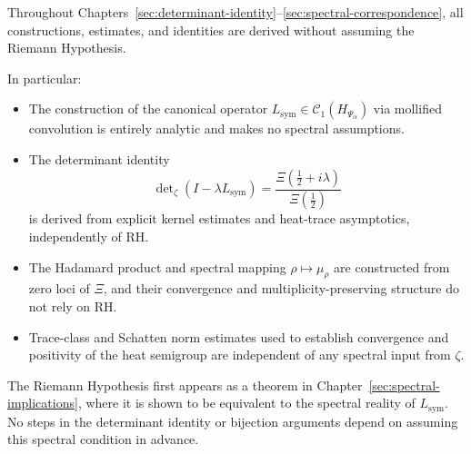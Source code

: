 \begin{remark}
\label{rem:no_rh_assumption}
Throughout Chapters~\ref{sec:determinant-identity}–\ref{sec:spectral-correspondence}, all constructions, estimates, and identities are derived without assuming the Riemann Hypothesis.

In particular:
\begin{itemize}
  \item The construction of the canonical operator \( L_{\mathrm{sym}} \in \mathcal{C}_1(H_{\Psi_\alpha}) \) via mollified convolution is entirely analytic and makes no spectral assumptions.
  \item The determinant identity
  \[
  \det\nolimits_{\zeta}(I - \lambda L_{\mathrm{sym}})
  = \frac{\Xi\left( \tfrac{1}{2} + i\lambda \right)}{\Xi\left( \tfrac{1}{2} \right)}
  \]
  is derived from explicit kernel estimates and heat-trace asymptotics, independently of RH.
  \item The Hadamard product and spectral mapping \( \rho \mapsto \mu_\rho \) are constructed from zero loci of \( \Xi \), and their convergence and multiplicity-preserving structure do not rely on RH.
  \item Trace-class and Schatten norm estimates used to establish convergence and positivity of the heat semigroup are independent of any spectral input from \( \zeta \).
\end{itemize}

The Riemann Hypothesis first appears as a theorem in Chapter~\ref{sec:spectral-implications}, where it is shown to be equivalent to the spectral reality of \( L_{\mathrm{sym}} \). No steps in the determinant identity or bijection arguments depend on assuming this spectral condition in advance.

\end{remark}
% 